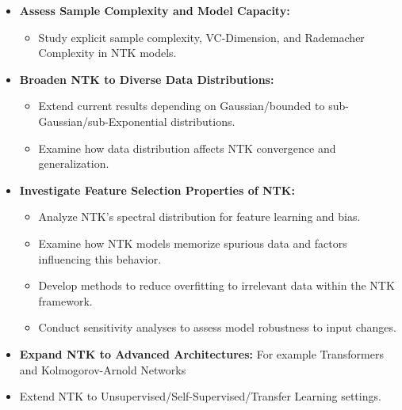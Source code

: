 \begin{itemize}
	
	
	\item \textbf{Assess Sample Complexity and Model Capacity:}
	\begin{itemize}
		\item Study explicit sample complexity, VC-Dimension, and Rademacher Complexity in NTK models.
	\end{itemize}
	
	\item \textbf{Broaden NTK to Diverse Data Distributions:}
	\begin{itemize}
		\item Extend current results depending on Gaussian/bounded to sub-Gaussian/sub-Exponential distributions.
		\item Examine how data distribution affects NTK convergence and generalization.
	\end{itemize}
	
	\item \textbf{Investigate Feature Selection Properties of NTK:}
	\begin{itemize}
		\item Analyze NTK's spectral distribution for feature learning and bias.
		
		\item Examine how NTK models memorize spurious data and factors influencing this behavior.
		
		\item Develop methods to reduce overfitting to irrelevant data within the NTK framework.
		
		\item Conduct sensitivity analyses to assess model robustness to input changes.
	\end{itemize}

\item \textbf{Expand NTK to Advanced Architectures:} For example Transformers and Kolmogorov-Arnold Networks

\item Extend NTK to Unsupervised/Self-Supervised/Transfer Learning settings.
\end{itemize}